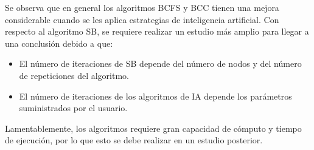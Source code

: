 Se observa que en general los algoritmos BCFS y BCC tienen una mejora considerable cuando se les aplica estrategias de inteligencia artificial. Con respecto al algoritmo SB, se requiere realizar un estudio más amplio para llegar a una conclusión debido a que:

\begin{itemize}
    \item El número de iteraciones de SB depende del número de nodos y del número de repeticiones del algoritmo.
    \item El número de iteraciones de los algoritmos de IA depende los parámetros suministrados por el usuario.
\end{itemize}

Lamentablemente, los algoritmos requiere gran capacidad de cómputo y tiempo de ejecución, por lo que esto se debe realizar en un estudio posterior.